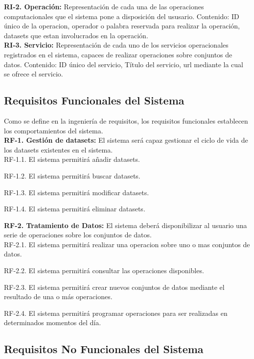 \documentclass[a4paper,11pt]{book}
\begin{document}
\textbf{RI-2. Operación:} Representación de cada una de las operaciones computacionales que el sistema pone a disposición del ususario. Contenido: ID único de la operacion, operador o palabra reservada para realizar la operación, datasets que estan involucrados en la operación. \\

\textbf{RI-3. Servicio:} Representación de cada uno de los servicios operacionales registrados en el sistema, capaces de realizar operaciones sobre conjuntos de datos. Contenido: ID único del servicio, Título del servicio, url mediante la cual se ofrece el servicio. \\

\subsection{Requisitos Funcionales del Sistema}

Como se define en la ingeniería de requisitos, los requisitos funcionales establecen los comportamientos del sistema.\\ 

\textbf{RF-1. Gestión de datasets:} El sistema será capaz gestionar el ciclo de vida de los datasets existentes en el sistema.\\
   

	RF-1.1. El sistema permitirá añadir datasets.

	RF-1.2. El sistema permitirá buscar datasets.

	RF-1.3. El sistema permitirá modificar datasets.

	RF-1.4. El sistema permitirá eliminar datasets.


\textbf{RF-2. Tratamiento de Datos:} El sistema deberá disponibilizar al usuario una serie de operaciones sobre los conjuntos de datos. \\   


	RF-2.1. El sistema permitirá realizar una operacion sobre uno o mas conjuntos de datos. 

	RF-2.2. El sistema permitirá consultar las operaciones disponibles. 

	RF-2.3. El sistema permitirá crear nuevos conjuntos de datos mediante el resultado de una o más operaciones. 

	RF-2.4. El sistema permitirá programar operaciones para ser realizadas en determinados momentos del día. 
	
\subsection{Requisitos No Funcionales del Sistema}
\end{document}
